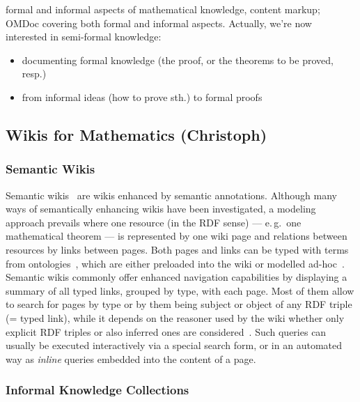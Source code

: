 \documentclass{llncs}
\begin{document}
formal and informal aspects of mathematical knowledge, content markup; OMDoc covering both
formal and informal aspects.  Actually, we're now interested in semi-formal
knowledge:
\begin{itemize}
\item documenting formal knowledge (the proof, or the theorems to be proved, resp.)
\item from informal ideas (how to prove sth.) to formal proofs
\end{itemize}

\subsection{Wikis for Mathematics (Christoph)}
\label{sec:math-wiki}

\subsubsection{Semantic Wikis}
\label{sec:semwiki}

Semantic wikis~\cite{semwiki06} are wikis enhanced by semantic annotations.  Although many
ways of semantically enhancing wikis have been investigated, a modeling approach prevails
where one resource (in the RDF sense) --- e.\,g.\ one mathematical theorem --- is
represented by one wiki page and relations between resources by links between pages.  Both
pages and links can be typed with terms from
ontologies~\cite{OrDeMoVoHa06:annotation-navigation-semwiki}, which are either preloaded
into the wiki or modelled ad-hoc~\cite{KrSchVr:semwiki-reasoning07}.  Semantic wikis
commonly offer enhanced navigation capabilities by displaying a summary of all typed
links, grouped by type, with each page.  Most of them allow to search for pages by type or
by them being subject or object of any RDF triple (= typed link), while it depends on the
reasoner used by the wiki whether only explicit RDF triples or also inferred ones are
considered~\cite{KrSchVr:semwiki-reasoning07}.  Such queries can usually be executed
interactively via a special search form, or in an automated way as \emph{inline} queries
embedded into the content of a page.

\subsubsection{Informal Knowledge Collections}
\label{sec:math-knowledge-collections}
\end{document}
